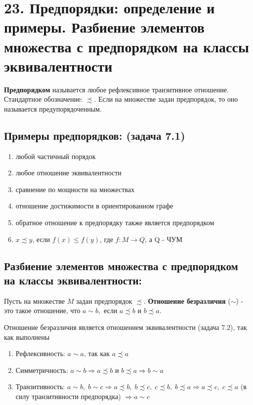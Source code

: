 \section*{23. Предпорядки: определение и примеры. Разбиение элементов множества с предпорядком на классы эквивалентности}
\par \textbf{Предпорядком} называется любое рефлексивное транзитивное отношение. Стандартное обозначение: $\precsim$. Если на множестве задан предпорядок, то оно называется предупорядоченным.
\subsection*{Примеры предпорядков: (задача 7.1)} 
\begin{enumerate}
    \item любой частичный порядок
    \item любое отношение эквивалентности 
    \item сравнение по мощности на множествах 
    \item отношение достижимости в ориентированном графе
    \item обратное отношение к предпорядку также является предпорядком
    \item $x \precsim y$, если $f(x) \leq f(y)$, где $f:M \rightarrow Q$, а Q - ЧУМ
\end{enumerate}
\subsection*{Разбиение элементов множества с предпорядком на классы эквивалентности: }
\par Пусть на множестве $M$ задан предпорядок $\precsim$. \textbf{Отношение безразличия} ($\sim$) - это такое отношение, что $a \sim b, \mbox{ если } a \precsim b \mbox{ и } b \precsim a$.
\par Отношение безразличия является отношением эквивалентности (задача 7.2), так как выполнены
\begin{enumerate}
    \item Рефлексивность: $a \sim a \mbox{, так как } a \precsim a$
    \item Симметричность: $a \sim b \Rightarrow a \precsim b \mbox{ и } b \precsim a \Rightarrow b \sim a$
    \item \par Транзитивность: $a \sim b, \; b \sim c \Rightarrow a \precsim b, \; b \precsim c, \; c \precsim b, \; b \precsim a \Rightarrow a \precsim c, \; c \precsim a$ (в силу транзитивности предпорядка) $\Rightarrow a \sim c$
\end{enumerate}

